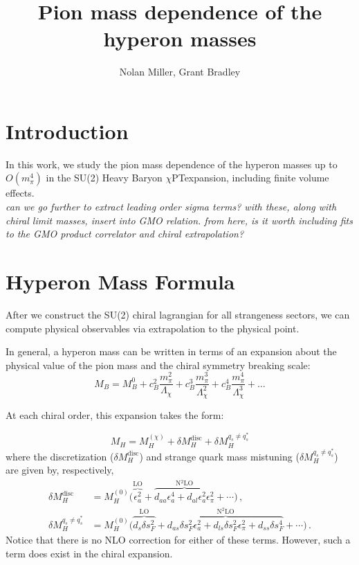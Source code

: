 \documentclass[12pt,tightenlines, raggedbottom, prd, notitlepage]{revtex4-1}
\def\CPT{{$\chi$PT}}
\begin{document}
\title{Pion mass dependence of the hyperon masses}
\author{Nolan Miller, Grant Bradley}
\maketitle

\section{Introduction}
In this work, we study the pion mass dependence of the hyperon masses up to $O(m_\pi^4)$ in the SU(2) Heavy Baryon \CPT expansion, including finite volume effects. \\

\textit{can we go further to extract leading order sigma terms? with these, along with chiral limit masses, insert into GMO relation. from here, is it worth including fits to the GMO product correlator and chiral extrapolation?}

\section{Hyperon Mass Formula}

After we construct the SU(2) chiral lagrangian for all strangeness sectors, we can compute physical observables via extrapolation to the physical point. 

In general, a hyperon mass can be written in terms of an expansion about the physical value of the pion mass and the chiral symmetry breaking scale:
\begin{equation}
  M_B = M_B^0 + c_B^2\frac{m_\pi^2}{\Lambda_\chi} + c_B^3\frac{m_\pi^3}{\Lambda_\chi^2} + c_B^4\frac{m_\pi^4}{\Lambda_\chi^3} + \dots
\end{equation}

At each chiral order, this expansion takes the form:

\begin{equation}
    M_H = M_H^{(\chi)} + \delta M_H^\text{disc} + \delta M_H^{q_s\ne q_s^*}
\end{equation}
where the discretization ($\delta M_H^\text{disc}$) and strange quark mass mistuning ($\delta M_H^{q_s\ne q_s^*}$) are given by, respectively,
\begin{align}
\delta M_H^\text{disc} &= M_H^{(0)} \big(
    \overbrace{\epsilon_a^2}^\text{LO}
    + \overbrace{d_{aa} \epsilon_a^4 
    + d_{al} \epsilon_a^2 \epsilon_\pi^2}^\text{N$^2$LO}
    + \cdots 
\big) \, , \\
\delta M_H^{q_s\ne q_s^*} &= M_H^{(0)} \big(
    \overbrace{d_s \delta s_F^2}^\text{LO}
    + \overbrace{d_{as} \delta s_F^2  \epsilon_a^2 
    + d_{ls} \delta s_F^2  \epsilon_\pi^2
    + d_{ss} \delta s_F^4}^\text{N$^2$LO}
    + \cdots 
\big) \, .
\end{align}
Notice that there is no NLO correction for either of these terms. However, such a term does exist in the chiral expansion.
\end{document}
